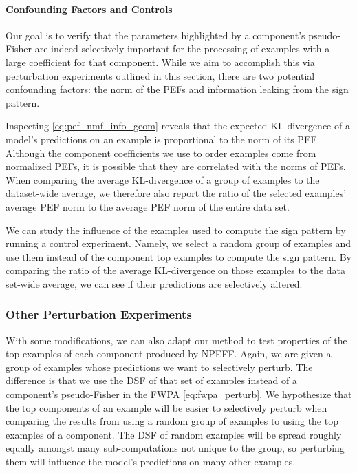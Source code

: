 \documentclass[dvipsnames]{article}
\begin{document}
\paragraph{Confounding Factors and Controls}
Our goal is to verify that the parameters highlighted by a component's pseudo-Fisher are indeed selectively important for the processing of examples with a large coefficient for that component.
While we aim to accomplish this via perturbation experiments outlined in this section, there are two potential confounding factors: the norm of the PEFs and information leaking from the sign pattern.

Inspecting \eqref{eq:pef_nmf_info_geom} reveals that the expected KL-divergence of a model's predictions on an example is proportional to the norm of its PEF.
Although the component coefficients we use to order examples come from normalized PEFs, it is possible that they are correlated with the norms of PEFs.
When comparing the average KL-divergence of a group of examples to the dataset-wide average, we therefore also report the ratio of the selected examples' average PEF norm to the average PEF norm of the entire data set.

We can study the influence of the examples used to compute the sign pattern by running a control experiment.
Namely, we select a random group of examples and use them instead of the component top examples to compute the sign pattern.
By comparing the ratio of the average KL-divergence on those examples to the data set-wide average, we can see if their predictions are selectively altered.

\subsubsection{Other Perturbation Experiments}\label{sec:other_pert_exps_methods}

With some modifications, we can also adapt our method to test properties of the top examples of each component produced by NPEFF.
Again, we are given a group of examples whose predictions we want to selectively perturb.
The difference is that we use the DSF of that set of examples instead of a component's pseudo-Fisher in the FWPA \eqref{eq:fwpa_perturb}.
 We hypothesize that the top components of an example will be easier to selectively perturb when comparing the results from using a random group of examples to using the top examples of a component.
The DSF of random examples will be spread roughly equally amongst many sub-computations not unique to the group, so perturbing them will influence the model's predictions on many other examples.
\end{document}
